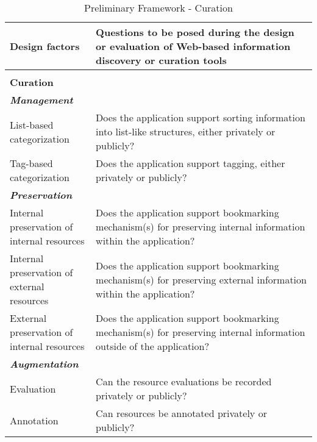 \begin{table*}[htbp]
\begin{tabular}{|p{0.30\linewidth}|p{0.65\linewidth}|}
\hline     

         
\end{tabular}
\end{table*}


\begin{table*}[htbp]
\caption{Preliminary Framework - Curation}
\centering
\small
\begin{tabular}{|p{0.28\linewidth}|p{0.72\linewidth}|}
\hline
\textbf{\large{Design factors}}   & \textbf{\large{Questions to be posed during the design or evaluation of Web-based information discovery or curation tools 
}}  \\

\hline     
&\\                                        
\textbf{\large{Curation}}                     &                                                                                                        \\     
  
\emph{\textbf{Management}}                    &                                                                                                           \\
List-based categorization               & Does the application support sorting information into list-like structures, either privately or publicly?                                                  \\
Tag-based categorization               & Does the application support tagging, either privately or publicly?                                                  \\

\emph{\textbf{Preservation}}                   &                                                                                                           \\
Internal preservation of internal resources       & Does the application support bookmarking mechanism(s) for preserving internal information within the application?        \\
Internal preservation of external resources       & Does the application support bookmarking mechanism(s) for preserving external information within the application?        \\
External preservation of internal resources      & Does the application support bookmarking mechanism(s) for preserving internal information outside of the application? \\ 

\emph{\textbf{Augmentation}}            &                                                                                                           \\
Evaluation                   & Can the resource evaluations be recorded privately or publicly? \\
Annotation                   & Can resources be annotated privately or publicly?                                                                               \\    
       

\end{tabular}
\end{table*}
